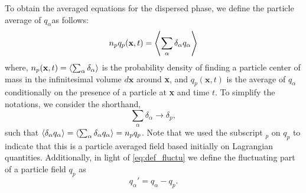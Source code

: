 To obtain the averaged equations for the dispersed phase, we define the particle average of $q_\alpha$​ as follows:
\begin{equation}
     n_p q_p(\textbf{x},t) = \left<\sum_\alpha\delta_\alpha q_\alpha\right>
     \label{eq:p_avg}
\end{equation}
where, $n_p(\textbf{x},t) = \left<\sum_\alpha \delta_\alpha\right>$ is the probability density of finding a particle center of mass in the infinitesimal volume $d\textbf{x}$ around \textbf{x}, and $q_p(\textbf{x},t)$ is the average of $q_\alpha$ conditionally on the presence of a particle at \textbf{x} and time $t$. 
To simplify the notations, we consider the shorthand,
\begin{equation*}
    \sum_\alpha \delta_\alpha \to \delta_p, 
\end{equation*}
such that $\left<\delta_\alpha q_\alpha\right>=\left<\sum_\alpha \delta_\alpha q_\alpha\right>=n_pq_p$.
Note that we used the subscript $_p$ on $q_p$ to indicate that this is a particle averaged field based initially on Lagrangian quantities.  
Additionally, in light of \ref{eq:def_fluctu} we define the fluctuating part of a particle field $q_p$ as
\begin{equation}
    q_\alpha' = q_\alpha - q_p. 
    \label{eq:def_fluc_p}
\end{equation}

